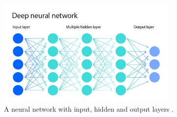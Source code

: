 \documentclass[12pt]{report}
\begin{document}
\begin{figure}[H]
    \centering
    \includegraphics[width=0.8\textwidth]{Proposal/NeuralNetworkCropped.png}
    \caption{A neural network with input, hidden and output layers \autocite{ibmWhatNeuralNetwork2021}.\label{fig:NeuralNetwork}}
\end{figure}
\end{document}
